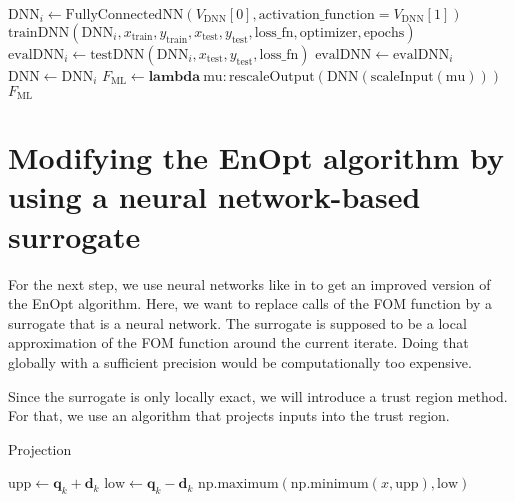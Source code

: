 \begin{algorithm}[H]
\begin{algorithmic}[1]
\State $\mathrm{DNN}_i \gets \mathrm{FullyConnectedNN}(V_\mathrm{DNN}[0], \mathrm{activation\_function}=V_\mathrm{DNN}[1])$
\State $\mathrm{trainDNN}(\mathrm{DNN}_i, x_\mathrm{train}, y_\mathrm{train}, x_\mathrm{test}, y_\mathrm{test}, \mathrm{loss\_fn}, \mathrm{optimizer}, \mathrm{epochs})$
\State $\mathrm{evalDNN}_i \gets \mathrm{testDNN}(\mathrm{DNN}_i, x_\mathrm{test}, y_\mathrm{test}, \mathrm{loss\_fn})$
\State $\mathrm{evalDNN} \gets \mathrm{evalDNN}_i$
\State $\mathrm{DNN} \gets \mathrm{DNN}_i$
\EndIf
\EndFor
\State $F_\mathrm{ML} \gets \mathbf{lambda}\:\mathrm{mu}: \mathrm{rescaleOutput}(\mathrm{DNN}(\mathrm{scaleInput}(\mathrm{mu})))$
\State \Return $F_\mathrm{ML}$
\EndProcedure
\end{algorithmic}
\end{algorithm}

\section{Modifying the EnOpt algorithm by using a neural network-based surrogate}
 For the next step, we use neural networks like in \cite{Keil2022-dj} to get an improved version of the EnOpt algorithm. Here, we want to replace calls of the FOM function by a surrogate that is a neural network. The surrogate is supposed to be a local approximation of the FOM function around the current iterate. Doing that globally with a sufficient precision would be computationally too expensive.
 
 Since the surrogate is only locally exact, we will introduce a trust region method. For that, we use an algorithm that projects inputs into the trust region.
 
 \begin{algorithm}[H]%
\caption{Projection}
\begin{algorithmic}[1]
\State $\mathrm{upp}\gets\mathbf{q}_k+\mathbf{d}_k$
\State $\mathrm{low}\gets\mathbf{q}_k-\mathbf{d}_k$
\State \Return $\mathrm{np.maximum}(\mathrm{np.minimum}(x,\mathrm{upp}),\mathrm{low})$
\EndProcedure
\end{algorithmic}
\end{algorithm}

